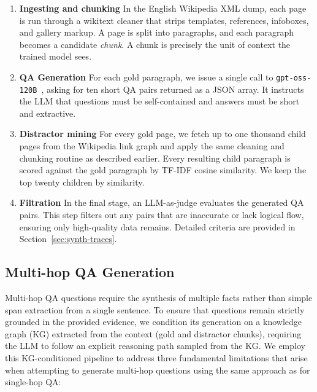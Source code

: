 \documentclass{llmxive}
\begin{document}
\begin{enumerate}
    \item \textbf{Ingesting and chunking} \hspace{0.5em} In the English Wikipedia XML dump, each page is run through a wikitext cleaner that strips templates, references, infoboxes, and gallery markup. A page is split into paragraphs, and each paragraph becomes a candidate \textit{chunk}. A chunk is precisely the unit of context the trained model sees.
    \item \textbf{QA Generation} \hspace{0.5em} For each gold paragraph, we issue a single call to \texttt{gpt-oss-120B}~\citep{openai2025gptoss120bgptoss20bmodel}, asking for ten short QA pairs returned as a JSON array. It instructs the LLM that questions must be self-contained and answers must be short and extractive.
    \item \textbf{Distractor mining} \hspace{0.5em} For every gold page, we fetch up to one thousand child pages from the Wikipedia link graph and apply the same cleaning and chunking routine as described earlier. Every resulting child paragraph is scored against the gold paragraph by TF-IDF cosine similarity. We keep the top twenty children by similarity.
    \item \textbf{Filtration} \hspace{0.5em} In the final stage, an LLM-as-judge evaluates the generated QA pairs. This step filters out any pairs that are inaccurate or lack logical flow, ensuring only high-quality data remains. Detailed criteria are provided in Section~\ref{sec:synth-traces}.
\end{enumerate}

\subsection{Multi-hop QA Generation}
\label{sec:synth-multihop}

Multi-hop QA questions require the synthesis of multiple facts rather than simple span extraction from a single sentence. To ensure that questions remain strictly grounded in the provided evidence, we condition its generation on a knowledge graph (KG) extracted from the context (gold and distractor chunks), requiring the LLM to follow an explicit reasoning path sampled from the KG. We employ this KG-conditioned pipeline to address three fundamental limitations that arise when attempting to generate multi-hop questions using the same approach as for single-hop QA:
\end{document}
